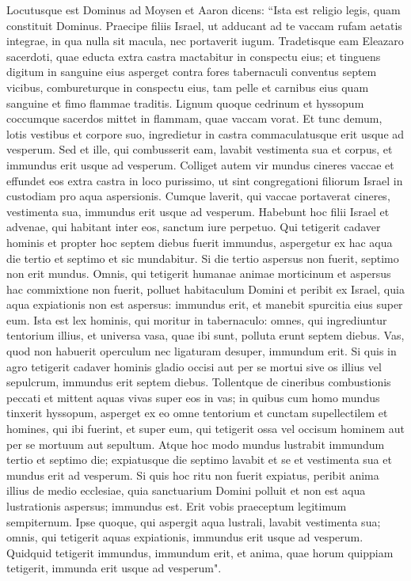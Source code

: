 \begin{biblechapter}  
\verse Locutusque est Dominus ad Moysen et Aaron dicens: 
\verse “Ista est religio legis, quam constituit Dominus. Praecipe filiis Israel, ut adducant ad te vaccam rufam aetatis integrae, in qua nulla sit macula, nec portaverit iugum.  
\verse Tradetisque eam Eleazaro sacerdoti, quae educta extra castra mactabitur in conspectu eius; 
\verse et tinguens digitum in sanguine eius asperget contra fores tabernaculi conventus septem vicibus, 
\verse combureturque in conspectu eius, tam pelle et carnibus eius quam sanguine et fimo flammae traditis. 
\verse Lignum quoque cedrinum et hyssopum coccumque sacerdos mittet in flammam, quae vaccam vorat. 
\verse Et tunc demum, lotis vestibus et corpore suo, ingredietur in castra commaculatusque erit usque ad vesperum. 
\verse Sed et ille, qui combusserit eam, lavabit vestimenta sua et corpus, et immundus erit usque ad vesperum. 
\verse Colliget autem vir mundus cineres vaccae et effundet eos extra castra in loco purissimo, ut sint congregationi filiorum Israel in custodiam pro aqua aspersionis. 
\verse Cumque laverit, qui vaccae portaverat cineres, vestimenta sua, immundus erit usque ad vesperum. Habebunt hoc filii Israel et advenae, qui habitant inter eos, sanctum iure perpetuo. 
\verse Qui tetigerit cadaver hominis et propter hoc septem diebus fuerit immundus, 
\verse aspergetur ex hac aqua die tertio et septimo et sic mundabitur. Si die tertio aspersus non fuerit, septimo non erit mundus. 
\verse Omnis, qui tetigerit humanae animae morticinum et aspersus hac commixtione non fuerit, polluet habitaculum Domini et peribit ex Israel, quia aqua expiationis non est aspersus: immundus erit, et manebit spurcitia eius super eum. 
\verse Ista est lex hominis, qui moritur in tabernaculo: omnes, qui ingrediuntur tentorium illius, et universa vasa, quae ibi sunt, polluta erunt septem diebus. 
\verse Vas, quod non habuerit operculum nec ligaturam desuper, immundum erit.  
\verse Si quis in agro tetigerit cadaver hominis gladio occisi aut per se mortui sive os illius vel sepulcrum, immundus erit septem diebus. 
\verse Tollentque de cineribus combustionis peccati et mittent aquas vivas super eos in vas; 
\verse in quibus cum homo mundus tinxerit hyssopum, asperget ex eo omne tentorium et cunctam supellectilem et homines, qui ibi fuerint, et super eum, qui tetigerit ossa vel occisum hominem aut per se mortuum aut sepultum. 
\verse Atque hoc modo mundus lustrabit immundum tertio et septimo die; expiatusque die septimo lavabit et se et vestimenta sua et mundus erit ad vesperum. 
\verse Si quis hoc ritu non fuerit expiatus, peribit anima illius de medio ecclesiae, quia sanctuarium Domini polluit et non est aqua lustrationis aspersus; immundus est. 
\verse Erit vobis praeceptum legitimum sempiternum. Ipse quoque, qui aspergit aqua lustrali, lavabit vestimenta sua; omnis, qui tetigerit aquas expiationis, immundus erit usque ad vesperum. 
\verse Quidquid tetigerit immundus, immundum erit, et anima, quae horum quippiam tetigerit, immunda erit usque ad vesperum". 
\end{biblechapter}

